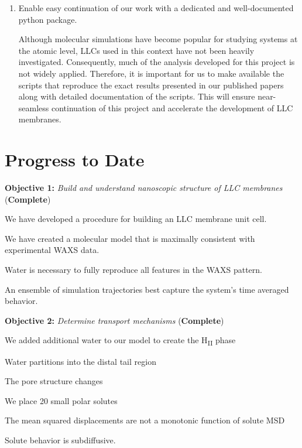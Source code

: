 \documentclass{article}
\begin{document}
\begin{enumerate}
    \item Enable easy continuation of our work with a dedicated and 
    well-documented python package.
    
	Although molecular simulations have become popular
	for studying systems at the atomic level, LLCs used in this context
	have not been heavily investigated. Consequently, much of the 
	analysis developed for this project is not widely applied. Therefore, 
	it is important for us to make available the scripts that reproduce
	the exact results presented in our published papers along with detailed
	documentation of the scripts. This will ensure near-seamless continuation
	of this project and accelerate the development of LLC membranes.
    
  \end{enumerate}

  \section{Progress to Date}\label{section:progress}
  
  \textbf{\large Objective 1:} \textit{\large Build and understand nanoscopic structure of LLC membranes} (\textcolor{green!40!olive}{\textbf{Complete}})
  
  \noindent We have developed a procedure for building an LLC membrane unit cell.
  
  \noindent We have created a molecular model that is maximally consistent with
  experimental WAXS data.
  
  \noindent Water is necessary to fully reproduce all features in the WAXS pattern.
  
  \noindent An ensemble of simulation trajectories best capture the system's 
  time averaged behavior.
  
  \noindent \textbf{\large Objective 2:} \textit{\large Determine transport mechanisms} (\textcolor{green!40!olive}{\textbf{Complete}})
  
  \noindent We added additional water to our model to create the H\textsubscript{II} phase
  
  \noindent Water partitions into the distal tail region
  
  \noindent The pore structure changes
  
  \noindent We place 20 small polar solutes 
  
  \noindent The mean squared displacements are not a monotonic function of solute MSD
  
  \noindent Solute behavior is subdiffusive.
  
\end{document}
